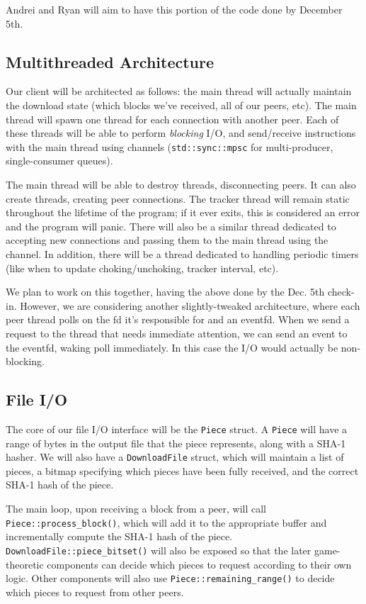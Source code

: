 \documentclass{article}
\begin{document}
    Andrei and Ryan will aim to have this portion of the code done by December 5th.

   \subsection{Multithreaded Architecture}

    Our client will be architected as follows: the main thread will actually maintain the download state (which blocks we've received, all of our peers, etc).
    The main thread will spawn one thread for each connection with another peer.
    Each of these threads will be able to perform \emph{blocking} I/O, and send/receive instructions with the main thread using channels (\texttt{std::sync::mpsc} for multi-producer, single-consumer queues).

    The main thread will be able to destroy threads, disconnecting peers.
    It can also create threads, creating peer connections.
    The tracker thread will remain static throughout the lifetime of the program; if it ever exits, this is considered an error and the program will panic.
    There will also be a similar thread dedicated to accepting new connections and passing them to the main thread using the channel.
    In addition, there will be a thread dedicated to handling periodic timers (like when to update choking/unchoking, tracker interval, etc).

    We plan to work on this together, having the above done by the Dec. 5th check-in.
    However, we are considering another slightly-tweaked architecture, where each peer thread polls on the fd it's responsible for and an eventfd.
    When we send a request to the thread that needs immediate attention, we can send an event to the eventfd, waking poll immediately.
    In this case the I/O would actually be non-blocking.

    \subsection{File I/O}

    The core of our file I/O interface will be the \verb|Piece| struct.
    A \verb|Piece| will have a range of bytes in the output file that the piece represents, along with a SHA-1 hasher.
    We will also have a \verb|DownloadFile| struct, which will maintain a list of pieces, a bitmap specifying which pieces have been fully received, and the correct SHA-1 hash of the piece.
    
    The main loop, upon receiving a block from a peer, will call \texttt{Piece::process\_block()}, which will add it to the appropriate buffer and incrementally compute the SHA-1 hash of the piece.
    \verb|DownloadFile::piece_bitset()| will also be exposed so that the later game-theoretic components can decide which pieces to request according to their own logic.
    Other components will also use \texttt{Piece::remaining\_range()} to decide which pieces to request from other peers.
\end{document}
